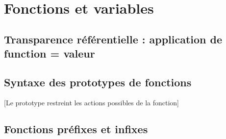 \section{ Fonctions et variables}

\subsection{ Transparence référentielle : application de function = valeur}

\subsection{ Syntaxe des prototypes de fonctions}

[Le prototype restreint les actions possibles de la fonction]

\subsection{ Fonctions préfixes et infixes}
